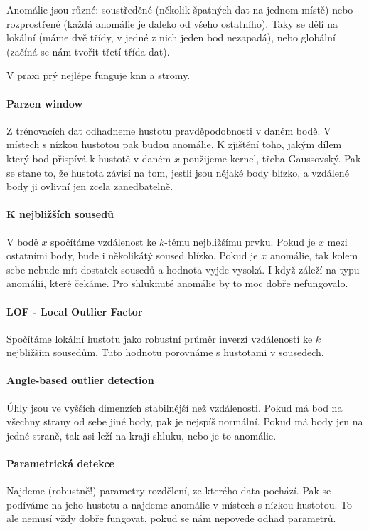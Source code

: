 \documentclass[10pt,a4paper]{article}
\begin{document}
Anomálie jsou různé: soustředěné (několik špatných dat na jednom místě) nebo rozprostřené (každá anomálie je daleko od všeho ostatního). Taky se dělí na lokální (máme dvě třídy, v jedné z nich jeden bod nezapadá), nebo globální (začíná se nám tvořit třetí třída dat).

V praxi prý nejlépe funguje knn a stromy.

\paragraph{Parzen window} Z trénovacích dat odhadneme hustotu pravděpodobnosti v daném bodě. V místech s nízkou hustotou pak budou anomálie. K zjištění toho, jakým dílem který bod přispívá k hustotě v daném $x$ použijeme kernel, třeba Gaussovský. Pak se stane to, že hustota závisí na tom, jestli jsou nějaké body blízko, a vzdálené body ji ovlivní jen zcela zanedbatelně.

\paragraph{K nejbližších sousedů} V bodě $x$ spočítáme vzdálenost ke $k$-tému nejbližšímu prvku. Pokud je $x$ mezi ostatními body, bude i několikátý soused blízko. Pokud je $x$ anomálie, tak kolem sebe nebude mít dostatek sousedů a hodnota vyjde vysoká. I když záleží na typu anomálií, které čekáme. Pro shluknuté anomálie by to moc dobře nefungovalo.

\paragraph{LOF - Local Outlier Factor} Spočítáme lokální hustotu jako robustní průměr inverzí vzdáleností ke $k$ nejbližším sousedům. Tuto hodnotu porovnáme s hustotami v sousedech.

\paragraph{Angle-based outlier detection} Úhly jsou ve vyšších dimenzích stabilnější než vzdálenosti. Pokud má bod na všechny strany od sebe jiné body, pak je nejspíš normální. Pokud má body jen na jedné straně, tak asi leží na kraji shluku, nebo je to anomálie.

\paragraph{Parametrická detekce} Najdeme (robustně!) parametry rozdělení, ze kterého data pochází. Pak se podíváme na jeho hustotu a najdeme anomálie v místech s nízkou hustotou. To ale nemusí vždy dobře fungovat, pokud se nám nepovede odhad parametrů.
\end{document}
